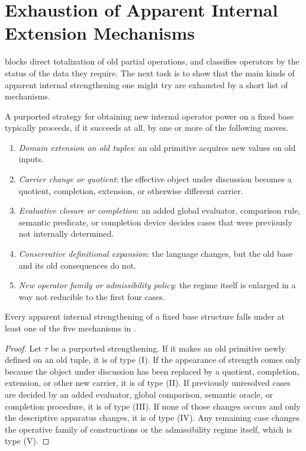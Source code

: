\section{Exhaustion of Apparent Internal Extension Mechanisms}\label{sec:exhaustion}

 blocks direct totalization of old partial operations, and  classifies operators by the status of the data they require. The next task is to show that the main kinds of apparent internal strengthening one might try are exhausted by a short list of mechanisms.

\begin{definition}\label{def:five-mechanisms}
A purported strategy for obtaining new internal operator power on a fixed base typically proceeds, if it succeeds at all, by one or more of the following moves.
\begin{enumerate}[label=\textup{(\Roman*)}, leftmargin=3em]
    \item \emph{Domain extension on old tuples}: an old primitive acquires new values on old inputs.
    \item \emph{Carrier change or quotient}: the effective object under discussion becomes a quotient, completion, extension, or otherwise different carrier.
    \item \emph{Evaluative closure or completion}: an added global evaluator, comparison rule, semantic predicate, or completion device decides cases that were previously not internally determined.
    \item \emph{Conservative definitional expansion}: the language changes, but the old base and its old consequences do not.
    \item \emph{New operator family or admissibility policy}: the regime itself is enlarged in a way not reducible to the first four cases.
\end{enumerate}
\end{definition}

\begin{theorem}\label{thm:exhaustion-theorem}
Every apparent internal strengthening of a fixed base structure falls under at least one of the five mechanisms in .
\end{theorem}

\begin{proof}
Let $\tau$ be a purported strengthening. If it makes an old primitive newly defined on an old tuple, it is of type (I). If the appearance of strength comes only because the object under discussion has been replaced by a quotient, completion, extension, or other new carrier, it is of type (II). If previously unresolved cases are decided by an added evaluator, global comparison, semantic oracle, or completion procedure, it is of type (III). If none of those changes occurs and only the descriptive apparatus changes, it is of type (IV). Any remaining case changes the operative family of constructions or the admissibility regime itself, which is type (V).
\end{proof}


